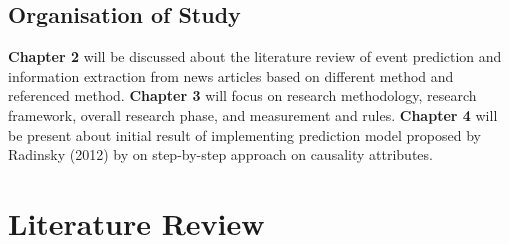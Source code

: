 \documentclass[twosides]{utmthesis}
\begin{document}
\section{Organisation of Study}
\noindent \textbf{Chapter 2} will be discussed about the literature review of event prediction and information extraction from news articles based on different method and referenced method. \noindent \textbf{Chapter 3} will focus on research methodology, research framework, overall research phase, and measurement and rules. \noindent \textbf{Chapter 4} will be present about initial result of implementing prediction model proposed by Radinsky (2012) by on step-by-step approach on causality attributes. 



\chapter{Literature Review}













\endmatter
\end{document}
